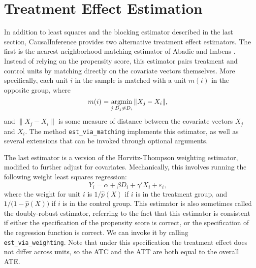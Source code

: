 \documentclass[12pt]{article}
\newcommand{\argmin}{\operatornamewithlimits{argmin}}
\theoremstyle{definition}
\theoremstyle{definition}
\theoremstyle{definition}
\theoremstyle{remark}
\begin{document}

\section{Treatment Effect Estimation} \label{sec.f}

In addition to least squares and the blocking estimator described in the last section, CausalInference provides two alternative treatment effect estimators. The first is the nearest neighborhood matching estimator of Abadie and Imbens \citeyear{AbadieImbens.2006}. Instead of relying on the propensity score, this estimator pairs treatment and control units by matching directly on the covariate vectors themselves. More specifically, each unit $i$ in the sample is matched with a unit $m(i)$ in the opposite group, where
\[m(i) = \argmin_{j: D_j \neq D_i} \|X_j - X_i\|,\]
and $\|X_j - X_i\|$ is some measure of distance between the covariate vectors $X_j$ and $X_i$. The method \texttt{est\_via\_matching} implements this estimator, as well as several extensions that can be invoked through optional arguments.

The last estimator is a version of the Horvitz-Thompson weighting estimator, modified to further adjust for covariates. Mechanically, this involves running the following weight least squares regression:
\[Y_i = \alpha + \beta D_i + \gamma' X_i + \varepsilon_i,\]
where the weight for unit $i$ is $1/\hat{p}(X)$ if $i$ is in the treatment group, and $1/\big(1-\hat{p}(X)\big)$ if $i$ is in the control group. This estimator is also sometimes called the doubly-robust estimator, referring to the fact that this estimator is consistent if either the specification of the propensity score is correct, or the specification of the regression function is correct. We can invoke it by calling \texttt{est\_via\_weighting}. Note that under this specification the treatment effect does not differ across units, so the ATC and the ATT are both equal to the overall ATE.
\end{document}
